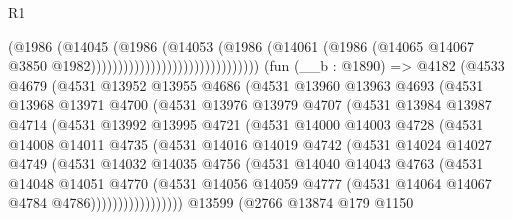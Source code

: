 \begin{lexlean}{R1}
\begin{coremodule}
                                                  (@1986
                                                    (@14045
                                                      (@1986
                                                        (@14053
                                                          (@1986
                                                            (@14061
                                                              (@1986
                                                                (@14065
                                                                  @14067
                                                                  @3850
                                                                  @1982)))))))))))))))))))))))))))))))
    (fun (__b : @1890) =>
    @4182
      (@4533
        @4679
        (@4531
          @13952
          @13955
          @4686
          (@4531
            @13960
            @13963
            @4693
            (@4531
              @13968
              @13971
              @4700
              (@4531
                @13976
                @13979
                @4707
                (@4531
                  @13984
                  @13987
                  @4714
                  (@4531
                    @13992
                    @13995
                    @4721
                    (@4531
                      @14000
                      @14003
                      @4728
                      (@4531
                        @14008
                        @14011
                        @4735
                        (@4531
                          @14016
                          @14019
                          @4742
                          (@4531
                            @14024
                            @14027
                            @4749
                            (@4531
                              @14032
                              @14035
                              @4756
                              (@4531
                                @14040
                                @14043
                                @4763
                                (@4531
                                  @14048
                                  @14051
                                  @4770
                                  (@4531
                                    @14056
                                    @14059
                                    @4777
                                    (@4531 @14064 @14067 @4784 @4786)))))))))))))))))
    @13599
    (@2766
      @13874
      @179
      @1150

\end{coremodule}
\end{lexlean}

